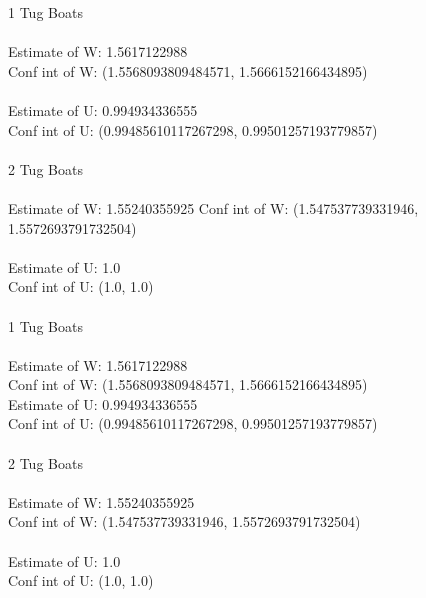 \documentclass{article}
\begin{document}
1 Tug Boats\\
\\
Estimate of W: 1.5617122988\\
Conf int of W: (1.5568093809484571, 1.5666152166434895)\\
\\
Estimate of U: 0.994934336555\\
Conf int of U: (0.99485610117267298, 0.99501257193779857)\\
\\
2 Tug Boats\\
\\
Estimate of W: 1.55240355925
Conf int of W: (1.547537739331946, 1.5572693791732504)\\
\\
Estimate of U: 1.0\\
Conf int of U: (1.0, 1.0)\\
\\
1 Tug Boats\\
\\
Estimate of W: 1.5617122988\\
Conf int of W: (1.5568093809484571, 1.5666152166434895)\\

Estimate of U: 0.994934336555\\
Conf int of U: (0.99485610117267298, 0.99501257193779857)\\
\\
2 Tug Boats\\
\\
Estimate of W: 1.55240355925\\
Conf int of W: (1.547537739331946, 1.5572693791732504)\\
\\
Estimate of U: 1.0\\
Conf int of U: (1.0, 1.0)\\
\end{document}
